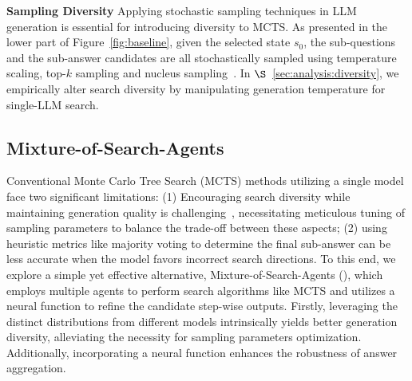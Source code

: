 \textbf{Sampling Diversity}
\hspace{5pt}
Applying stochastic sampling techniques in LLM generation is essential for introducing diversity to MCTS.
As presented in the lower part of Figure~\ref{fig:baseline}, given the selected state $s_0$, the sub-questions and the sub-answer candidates are all stochastically sampled using temperature scaling, top-$k$ sampling and nucleus sampling~\cite{Holtzman2020The}.
In $\S$~\ref{sec:analysis:diversity}, we empirically alter search diversity by manipulating generation temperature for single-LLM search.






\subsection{Mixture-of-Search-Agents}
\label{sec:method:mosa}


Conventional Monte Carlo Tree Search (MCTS) methods utilizing a single model face two significant limitations:
(1) Encouraging search diversity while maintaining generation quality is challenging~\cite{tradeoff}, necessitating meticulous tuning of sampling parameters to balance the trade-off between these aspects;
(2) using heuristic metrics like majority voting to determine the final sub-answer can be less accurate when the model favors incorrect search directions.
To this end, we explore a simple yet effective alternative, Mixture-of-Search-Agents (\mosa), which employs multiple agents to perform search algorithms like MCTS and utilizes a neural function to refine the candidate step-wise outputs.
Firstly, leveraging the distinct distributions from different models intrinsically yields better generation diversity, alleviating the necessity for sampling parameters optimization.
Additionally, incorporating a neural function enhances the robustness of answer aggregation.


